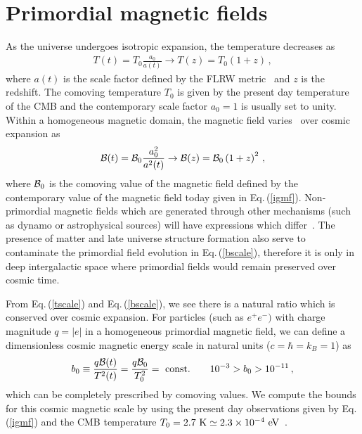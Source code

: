 \documentclass[a4paper]{article}
\newcommand*{\eV}{\text{ eV}}
\newcommand{\req}[1]{Eq.\,(\ref{#1})}
\begin{document}
\section{Primordial magnetic fields}
\label{sec:primordial}
\noindent As the universe undergoes isotropic expansion, the temperature decreases as 
\begin{align}
    \label{tscale}
    T(t)=T_{0}\frac{a_{0}}{a(t)}\rightarrow T(z)=T_{0}(1+z)\,,
\end{align}
where $a(t)$ is the scale factor defined by the FLRW metric~\cite{weinberg1972gravitation} and $z$ is the redshift. The comoving temperature $T_{0}$ is given by the present day temperature of the CMB and the contemporary scale factor $a_{0}=1$ is usually set to unity. Within a homogeneous magnetic domain, the magnetic field varies~\cite{durrer2013cosmological} over cosmic expansion as
\begin{align}
    \label{bscale}
    {\cal B}(t)={\cal B}_{0}\frac{a_{0}^{2}}{a^{2}(t)}\rightarrow{\cal B}(z)={\cal B}_{0}\left(1+z\right)^{2}\,,
\end{align}
where ${\cal B}_{0}$ is the comoving value of the magnetic field defined by the contemporary value of the magnetic field today given in \req{igmf}. Non-primordial magnetic fields which are generated through other mechanisms (such as dynamo or astrophysical sources) will have expressions which differ~\cite{pomakov2022redshift}. The presence of matter and late universe structure formation also serve to contaminate the primordial field evolution in \req{bscale}, therefore it is only in deep intergalactic space where primordial fields would remain preserved over cosmic time.

From \req{tscale} and \req{bscale}, we see there is a natural ratio which is conserved over cosmic expansion. For particles (such as $e^{+}e^{-})$ with charge magnitude $q=|e|$ in a homogeneous primordial magnetic field, we can define a dimensionless cosmic magnetic energy scale in natural units ($c=\hbar=k_{B}=1$) as
\begin{align}
    \label{tbscale}
    b_{0}\equiv\frac{q{\cal B}(t)}{T^{2}(t)}=\frac{q{\cal B}_{0}}{T_{0}^{2}}={\rm\ const.}\qquad10^{-3}>b_{0}>10^{-11}\,,
\end{align}
which can be completely prescribed by comoving values. We compute the bounds for this cosmic magnetic scale by using the present day observations given by \req{igmf} and the CMB temperature $T_{0}=2.7{\rm\ K}\simeq2.3\times10^{-4}\eV$~\cite{aghanim2018planck}.
\end{document}
